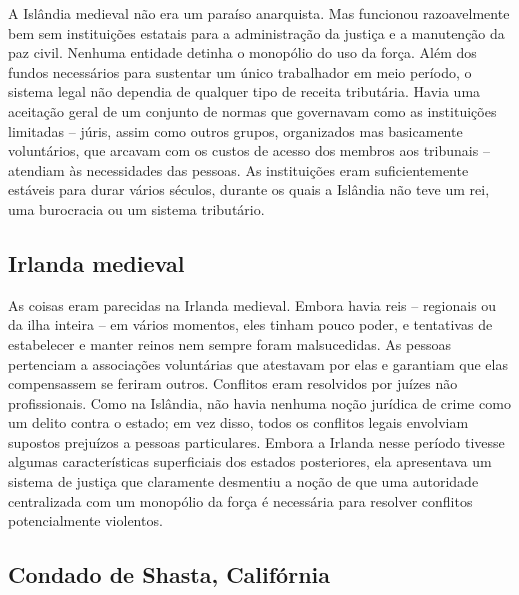 A Islândia medieval não era um paraíso anarquista. Mas funcionou razoavelmente bem sem instituições estatais para a administração da justiça e a manutenção da paz civil. Nenhuma entidade detinha o monopólio do uso da força. Além dos fundos necessários para sustentar um único trabalhador em meio período, o sistema legal não dependia de qualquer tipo de receita tributária. Havia uma aceitação geral de um conjunto de normas que governavam como as instituições limitadas -- júris, assim como outros grupos, organizados mas basicamente voluntários, que arcavam com os custos de acesso dos membros aos tribunais -- atendiam às necessidades das pessoas. As instituições eram suficientemente estáveis para durar vários séculos, durante os quais a Islândia não teve um rei, uma burocracia ou um sistema tributário.

\subsection*{Irlanda medieval}

As coisas eram parecidas na Irlanda medieval. Embora havia reis -- regionais ou da ilha inteira -- em vários momentos, eles tinham pouco poder, e tentativas de estabelecer e manter reinos nem sempre foram malsucedidas. As pessoas pertenciam a associações voluntárias que atestavam por elas e garantiam que elas compensassem se feriram outros. Conflitos eram resolvidos por juízes não profissionais. Como na Islândia, não havia nenhuma noção jurídica de crime como um delito contra o estado; em vez disso, todos os conflitos legais envolviam supostos prejuízos a pessoas particulares. Embora a Irlanda nesse período tivesse algumas características superficiais dos estados posteriores, ela apresentava um sistema de justiça que claramente desmentiu a noção de que uma autoridade centralizada com um monopólio da força é necessária para resolver conflitos potencialmente violentos.

\subsection*{Condado de Shasta, Califórnia}

